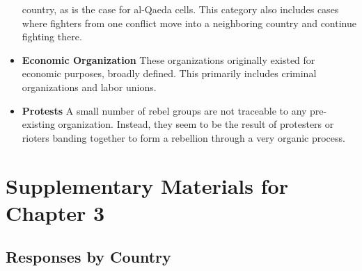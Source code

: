 \documentclass[12pt,]{book}
\theoremstyle{definition}
\theoremstyle{definition}
\theoremstyle{definition}
\theoremstyle{remark}
\begin{document}
\begin{itemize}
  country, as is the case for al-Qaeda cells. This category also
  includes cases where fighters from one conflict move into a
  neighboring country and continue fighting there.
\item
  \textbf{Economic Organization} These organizations originally existed
  for economic purposes, broadly defined. This primarily includes
  criminal organizations and labor unions.
\item
  \textbf{Protests} A small number of rebel groups are not traceable to
  any pre-existing organization. Instead, they seem to be the result of
  protesters or rioters banding together to form a rebellion through a
  very organic process.
\end{itemize}

\hypertarget{supplementary-materials-for-chapter-3}{%
\section{Supplementary Materials for Chapter
3}\label{supplementary-materials-for-chapter-3}}

\pagebreak

\hypertarget{responses-by-country}{%
\subsection*{Responses by Country}\label{responses-by-country}}

\singlespacing
\end{document}
